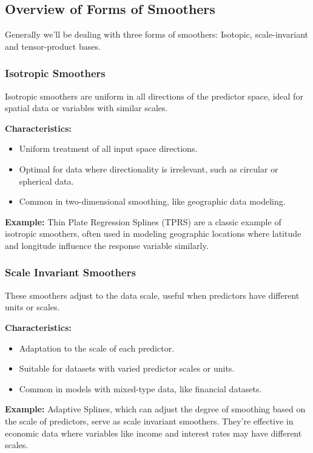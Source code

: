 \documentclass[12pt, twoside,hidelinks]{article}
\theoremstyle{definition}
\numberwithin{equation}{section}
\begin{document}
\subsection{Overview of Forms of Smoothers}

Generally we'll be dealing with three forms of smoothers: Isotopic, scale-invariant and tensor-product bases.

\subsubsection{Isotropic Smoothers}
Isotropic smoothers are uniform in all directions of the predictor space, ideal for spatial data or variables with similar scales.

\textbf{Characteristics:}
\begin{itemize}
    \item Uniform treatment of all input space directions.
    \item Optimal for data where directionality is irrelevant, such as circular or spherical data.
    \item Common in two-dimensional smoothing, like geographic data modeling.
\end{itemize}

\textbf{Example:} Thin Plate Regression Splines (TPRS) are a classic example of isotropic smoothers, often used in modeling geographic locations where latitude and longitude influence the response variable similarly.

\subsubsection{Scale Invariant Smoothers}
These smoothers adjust to the data scale, useful when predictors have different units or scales.

\textbf{Characteristics:}
\begin{itemize}
    \item Adaptation to the scale of each predictor.
    \item Suitable for datasets with varied predictor scales or units.
    \item Common in models with mixed-type data, like financial datasets.
\end{itemize}

\textbf{Example:} Adaptive Splines, which can adjust the degree of smoothing based on the scale of predictors, serve as scale invariant smoothers. They're effective in economic data where variables like income and interest rates may have different scales.
\end{document}
